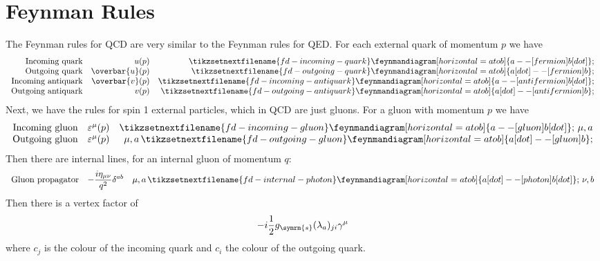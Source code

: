 \documentclass[fleqn]{NotesClass}
\newcommand{\strongCoupling}{g_{\symrm{s}}}
\newcommand{\diracadjoint}[1]{\overbar{#1}}
\newcommand{\minkowskiMetric}{\eta}
\begin{document}
    \section{Feynman Rules}
    The Feynman rules for QCD are very similar to the Feynman rules for QED.
    For each external quark of momentum \(p\) we have
    \begin{equation}
        \begin{array}{rrr}
            \text{Incoming quark} & u(p) & \tikzsetnextfilename{fd-incoming-quark}\feynmandiagram[horizontal=a to b]{a -- [fermion] b [dot]}; \\
            \text{Outgoing quark} & \diracadjoint{u}(p) & \tikzsetnextfilename{fd-outgoing-quark}\feynmandiagram[horizontal=a to b]{a [dot] -- [fermion] b}; \\
            \text{Incoming antiquark} & \diracadjoint{v}(p) & \tikzsetnextfilename{fd-incoming-antiquark}\feynmandiagram[horizontal=a to b]{a -- [anti fermion] b [dot]}; \\
            \text{Outgoing antiquark} & v(p) & \tikzsetnextfilename{fd-outgoing-antiquark}\feynmandiagram[horizontal=a to b]{a [dot] -- [anti fermion] b};
        \end{array}
    \end{equation}
    Next, we have the rules for spin 1 external particles, which in QCD are just gluons.
    For a gluon with momentum \(p\) we have
    \begin{equation}
        \begin{array}{rrr}
            \text{Incoming gluon} & \varepsilon^\mu(p) & \tikzsetnextfilename{fd-incoming-gluon}\feynmandiagram[horizontal=a to b]{a -- [gluon] b [dot]}; \, \mu, a \\
            \text{Outgoing gluon} & \varepsilon^\mu(p) & \mu, a \, \tikzsetnextfilename{fd-outgoing-gluon}\feynmandiagram[horizontal=a to b]{a [dot] -- [gluon] b};
        \end{array}
    \end{equation}
    Then there are internal lines, for an internal gluon of momentum \(q\):
    \begin{equation}
        \begin{array}{rrr}
            \text{Gluon propagator} & \displaystyle-\frac{i\minkowskiMetric_{\mu\nu}}{q^2}\delta^{ab} & \mu, a \, \tikzsetnextfilename{fd-internal-photon}\feynmandiagram[horizontal=a to b]{a [dot] -- [photon] b [dot]}; \, \nu, b
        \end{array}
    \end{equation}
    Then there is a vertex factor of
    \begin{equation}
        -i\frac{1}{2}\strongCoupling (\lambda_a)_{ji}\gamma^\mu
    \end{equation}
    where \(c_j\) is the colour of the incoming quark and \(c_i\) the colour of the outgoing quark.
    
\end{document}
